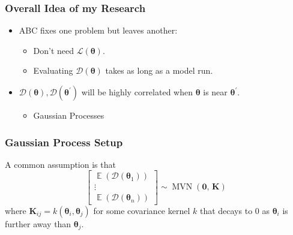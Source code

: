 \documentclass{beamer}
\DeclareMathOperator{\E}{\mathbb{E}}
\DeclareMathOperator{\MVN}{MVN}
\begin{document}


\begin{frame}
    \frametitle{Overall Idea of my Research}
    \begin{itemize}
        \item ABC fixes one problem but leaves another:
              \begin{itemize}
                  \item Don't need $\mathcal{L}(\bm{\theta}).$
                  \item Evaluating $\mathcal{D}(\bm{\theta})$ takes as long as
                        a model run.
              \end{itemize}
        \item <2-> $\mathcal{D}(\bm{\theta}), \mathcal{D}(\bm{\theta}^\prime)$
              will be highly correlated when $\bm{\theta}$ is near
              $\bm{\theta}^\prime.$
              \begin{itemize}
                  \item Gaussian Processes
              \end{itemize}
    \end{itemize}
\end{frame}

\begin{frame}
    \frametitle{Gaussian Process Setup}

    A common assumption is that
    $$\begin{bmatrix}
            \E(\mathcal{D}(\bm{\theta}_1)) \\
            \vdots                         \\
            \E(\mathcal{D}(\bm{\theta}_n))
        \end{bmatrix} \sim
        \MVN\left(\mathbf{0},\, \mathbf{K}\right)$$
    where $\mathbf{K}_{ij} = k(\bm{\theta}_i, \bm{\theta}_j)$ for some
    covariance kernel $k$ that decays to 0 as $\bm{\theta}_i$ is further away
    than $\bm{\theta}_j.$
\end{frame}

\end{document}
